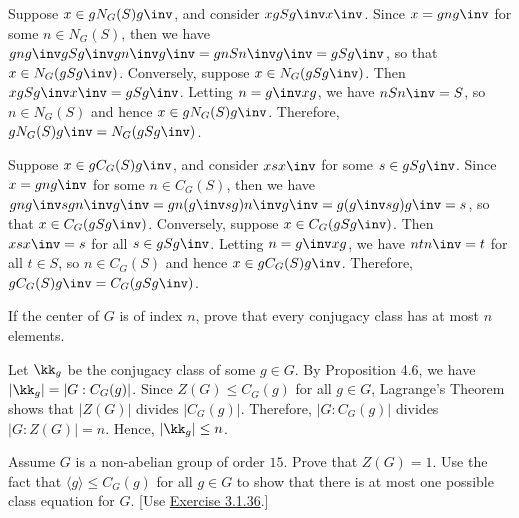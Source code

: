 \begin{sol}
	Suppose $x \in gN_G(S)g\inv$, and consider $xgSg\inv x\inv$. Since $x = gng\inv$ for some $n \in N_G(S)$, then we have $gng\inv gSg\inv gn\inv g\inv = g n S n\inv g\inv = g S g\inv$, so that $x \in N_G(gSg\inv)$. Conversely, suppose $x \in N_G(gSg\inv)$. Then $xgSg\inv x\inv = gSg\inv$. Letting $n = g\inv x g$, we have $n S n\inv = S$, so $n \in N_G(S)$ and hence $x \in gN_G(S)g\inv$. Therefore, $gN_G(S)g\inv = N_G(gSg\inv)$.

	Suppose $x \in gC_G(S)g\inv$, and consider $xsx\inv$ for some $s \in gSg\inv$. Since $x = gng\inv$ for some $n \in C_G(S)$, then we have $gng\inv s g n\inv g\inv = g n (g\inv s g) n\inv g\inv = g (g\inv s g) g\inv = s$, so that $x \in C_G(gSg\inv)$. Conversely, suppose $x \in C_G(gSg\inv)$. Then $xsx\inv = s$ for all $s \in gSg\inv$. Letting $n = g\inv x g$, we have $n t n\inv = t$ for all $t \in S$, so $n \in C_G(S)$ and hence $x \in gC_G(S)g\inv$. Therefore, $gC_G(S)g\inv = C_G(gSg\inv)$.
\end{sol}

\begin{exercise}
	If the center of $G$ is of index $n$, prove that every conjugacy class has at most $n$ elements.
\end{exercise}

\begin{sol}
	Let $\kk_g$ be the conjugacy class of some $g \in G$. By Proposition 4.6, we have $|\kk_g| = |G : C_G(g)|$. Since $Z(G) \leq C_G(g)$ for all $g \in G$, Lagrange's Theorem shows that $|Z(G)|$ divides $|C_G(g)|$. Therefore, $|G : C_G(g)|$ divides $|G : Z(G)| = n$. Hence, $|\kk_g| \leq n$.
\end{sol}

\newpage

\begin{specialexercise}
	Assume $G$ is a non-abelian group of order $15$. Prove that $Z(G)=1$. Use the fact that $\langle g \rangle \le C_G(g)$ for all $g \in G$ to show that there is at most one possible class equation for $G$. [Use \hyperref[ex3.1.36]{Exercise 3.1.36}.]
\end{specialexercise}

